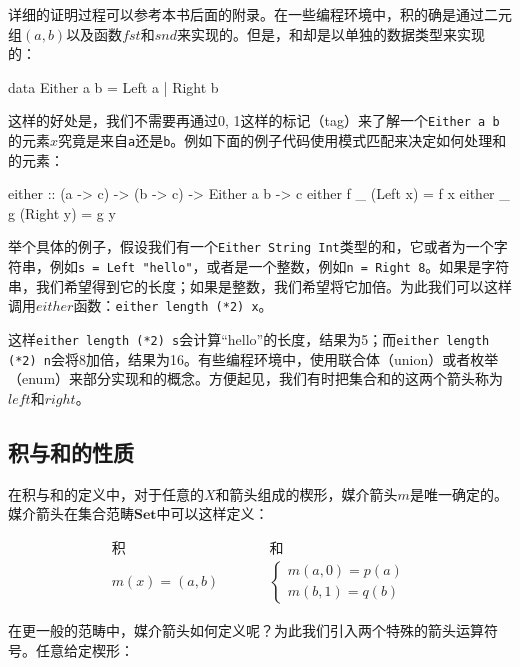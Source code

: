 \documentclass[b5paper]{ctexart}
\begin{document}
详细的证明过程可以参考本书后面的附录。在一些编程环境中，积的确是通过二元组$(a, b)$以及函数$fst$和$snd$来实现的。但是，和却是以单独的数据类型来实现的：

\begin{Haskell}[frame = single]
data Either a b = Left a | Right b
\end{Haskell}

这样的好处是，我们不需要再通过0, 1这样的标记（tag）来了解一个\texttt{Either a b}的元素$x$究竟是来自\texttt{a}还是\texttt{b}。例如下面的例子代码使用模式匹配来决定如何处理和的元素：

\begin{Haskell}
either :: (a -> c) -> (b -> c) -> Either a b -> c
either f _ (Left x)     =  f x
either _ g (Right y)    =  g y
\end{Haskell}
\lstset{frame = none}

举个具体的例子，假设我们有一个\texttt{Either String Int}类型的和，它或者为一个字符串，例如\texttt{s = Left "hello"}，或者是一个整数，例如\texttt{n = Right 8}。如果是字符串，我们希望得到它的长度；如果是整数，我们希望将它加倍。为此我们可以这样调用$either$函数：\texttt{either length (*2) x}。

这样\texttt{either length (*2) s}会计算“hello”的长度，结果为5；而\texttt{either length (*2) n}会将8加倍，结果为16。有些编程环境中，使用联合体（union）或者枚举（enum）来部分实现和的概念。方便起见，我们有时把集合和的这两个箭头称为$left$和$right$。

\subsection{积与和的性质}

在积与和的定义中，对于任意的$X$和箭头组成的楔形，媒介箭头$m$是唯一确定的。媒介箭头在集合范畴$\pmb{Set}$中可以这样定义：

\[
\begin{array}{ccc}
\text{积} & & \text{和} \\
m(x) = (a, b) & \quad \quad &
\begin{cases}
m (a, 0) = p(a) \\
m (b, 1) = q(b)
\end{cases}
\end{array}
\]

在更一般的范畴中，媒介箭头如何定义呢？为此我们引入两个特殊的箭头运算符号。任意给定楔形：

\begin{center}
\end{center}
\end{document}

